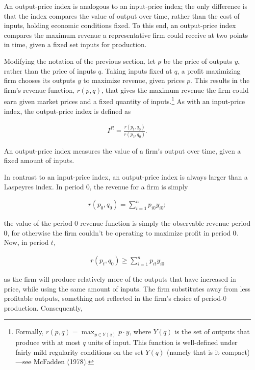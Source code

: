 \documentclass[]{article}
\begin{document}
An output-price index is analogous to an input-price index; the only difference is that the index compares the value of output over time, rather than the cost of inputs, holding economic conditions fixed. To this end, an output-price index compares the maximum revenue a representative firm could receive at two points in time, given a fixed set inputs for production.

Modifying the notation of the previous section, let \(p\) be the price of outputs \(y\), rather than the price of inputs \(q\). Taking inputs fixed at \(q\), a profit maximizing firm chooses its outputs \(y\) to maximize revenue, given prices \(p\). This results in the firm's revenue function, \(r(p, q)\), that gives the maximum revenue the firm could earn given market prices and a fixed quantity of inputs.\footnote{Formally, \(r(p, q) = \max_{y \in Y(q)} p \cdot y\), where \(Y(q)\) is the set of outputs that produce with at most \(q\) units of input. This function is well-defined under fairly mild regularity conditions on the set \(Y(q)\) (namely that is it compact)---see McFadden (1978).} As with an input-price index, the output-price index is defined as

\begin{align*}
I^{R} = \frac{r(p_{t}, q_{0})}{r(p_{0}, q_{0})}.
\end{align*}

An output-price index measures the value of a firm's output over time, given a fixed amount of inputs.

In contrast to an input-price index, an output-price index is always larger than a Laspeyres index. In period 0, the revenue for a firm is simply

\begin{align*}
r(p_{0}, q_{0}) = \sum_{i = 1}^{n} p_{i0} y_{i0};
\end{align*}

the value of the period-0 revenue function is simply the observable revenue period 0, for otherwise the firm couldn't be operating to maximize profit in period 0. Now, in period \(t\),

\begin{align*}
r(p_{t}, q_{0}) \geq \sum_{i = 1}^{n} p_{it} y_{i0}
\end{align*}

as the firm will produce relatively more of the outputs that have increased in price, while using the same amount of inputs. The firm substitutes away from less profitable outputs, something not reflected in the firm's choice of period-0 production. Consequently,
\end{document}
